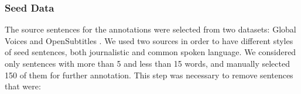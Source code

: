 
\subsubsection{Seed Data}

The source sentences for the annotations were selected from two datasets:  Global Voices \citep{tiedemann-2012-parallel} and OpenSubtitles \citep{opensubtitles2016}. We used two sources in order to have different styles of seed sentences, both journalistic and common spoken language. We considered only sentences with more than 5 and less than 15 words, and manually selected 150 of them for further annotation. This step was necessary to remove sentences that were:

